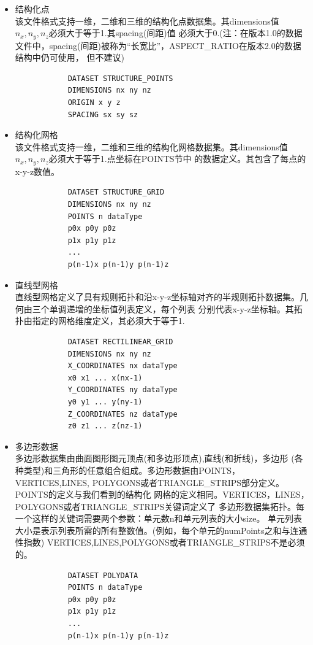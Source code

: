 \documentclass[UTF8]{ctexart}
\begin{document}
\begin{itemize}
    \item {
        结构化点 \\
        该文件格式支持一维，二维和三维的结构化点数据集。其dimensions值$n_x,n_y,n_z$必须大于等于1.其spacing(间距)值
        必须大于0.(注：在版本1.0的数据文件中，spacing(间距)被称为“长宽比”，ASPECT\_RATIO在版本2.0的数据结构中仍可使用，
        但不建议) \\
        \begin{verbatim}
            DATASET STRUCTURE_POINTS 
            DIMENSIONS nx ny nz
            ORIGIN x y z
            SPACING sx sy sz
        \end{verbatim}
    }
    \item {
        结构化网格 \\
        该文件格式支持一维，二维和三维的结构化网格数据集。其dimensions值$n_x,n_y,n_z$必须大于等于1.点坐标在POINTS节中
        的数据定义。其包含了每点的x-y-z数值。
        \begin{verbatim}
            DATASET STRUCTURE_GRID
            DIMENSIONS nx ny nz
            POINTS n dataType
            p0x p0y p0z
            p1x p1y p1z
            ...
            p(n-1)x p(n-1)y p(n-1)z
        \end{verbatim}
    }
    \item {
        直线型网格 \\
        直线型网格定义了具有规则拓扑和沿x-y-z坐标轴对齐的半规则拓扑数据集。几何由三个单调递增的坐标值列表定义，每个列表
        分别代表x-y-z坐标轴。其拓扑由指定的网格维度定义，其必须大于等于1.
        \begin{verbatim}
            DATASET RECTILINEAR_GRID
            DIMENSIONS nx ny nz
            X_COORDINATES nx dataType
            x0 x1 ... x(nx-1)
            Y_COORDINATES ny dataType
            y0 y1 ... y(ny-1)
            Z_COORDINATES nz dataType
            z0 z1 ... z(nz-1)
        \end{verbatim}
    }
    \item {
        多边形数据 \\
        多边形数据集由曲面图形图元顶点(和多边形顶点),直线(和折线)，多边形
        (各种类型)和三角形的任意组合组成。多边形数据由POINTS，VERTICES,LINES,
        POLYGONS或者TRIANGLE\_STRIPS部分定义。POINTS的定义与我们看到的结构化
        网格的定义相同。VERTICES，LINES，POLYGONS或者TRIANGLE\_STRIPS关键词定义了
        多边形数据集拓扑。每一个这样的关键词需要两个参数：单元数n和单元列表的大小size。
        单元列表大小是表示列表所需的所有整数值。(例如，每个单元的numPoints之和与连通性指数)
        VERTICES,LINES,POLYGONS或者TRIANGLE\_STRIPS不是必须的。
        \begin{verbatim}
            DATASET POLYDATA
            POINTS n dataType
            p0x p0y p0z
            p1x p1y p1z
            ... 
            p(n-1)x p(n-1)y p(n-1)z 


\end{verbatim}}
\end{itemize}
\end{document}
